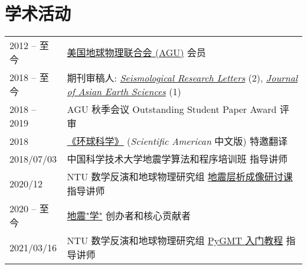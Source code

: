 \section*{学术活动}

\newcommand{\tabitem}{~~\llap{\textbullet}~~}

\begin{tabular}{p{} p{}}
2012 -- 至今 & \href{https://sites.agu.org/}{美国地球物理联合会 (AGU)} 会员 \\
2018 -- 至今 & 期刊审稿人:
                \textit{\href{https://pubs.geoscienceworld.org/srl/}{Seismological Research Letters}} (2),
                \textit{\href{https://www.journals.elsevier.com/journal-of-asian-earth-sciences/}{Journal of Asian Earth Sciences}} (1) \\
2018 -- 2019 & AGU 秋季会议 Outstanding Student Paper Award 评审 \\
2018         & \href{https://huanqiukexue.com/}{《环球科学》} (\textit{Scientific American} 中文版) 特邀翻译 \\
2018/07/03   & 中国科学技术大学地震学算法和程序培训班 指导讲师 \\
2020/12 & NTU 数学反演和地球物理研究组 \href{https://migg-ntu.github.io/SeisTomo_Tutorials/}{地震层析成像研讨课} 指导讲师 \\
2020 -- 至今 & \href{https://seismo-learn.org/}{地震"学"} 创办者和核心贡献者 \\
2021/03/16 & NTU 数学反演和地球物理研究组 \href{https://github.com/MIGG-NTU/PyGMT2021}{PyGMT 入门教程} 指导讲师 \\
\end{tabular}
